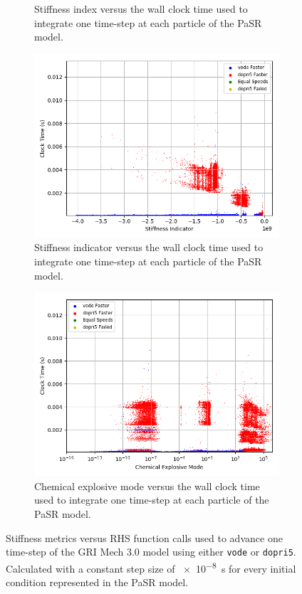 \documentclass[12pt]{ussci}
\begin{document}
\begin{figure}[htbp]
\begin{subfigure}{0.43\textwidth}
       \caption{Stiffness index versus the wall clock time used to integrate one time-step at each particle of the PaSR model.}
       \label{fig:SI1GRIPaSR}
   \end{subfigure}
   \begin{subfigure}{0.43\textwidth}
       \includegraphics[width=\linewidth]{GRI_Mech_3/PaSR_Int_Times_Indicator_Groupings_1e-08.png}
       \caption{Stiffness indicator versus the wall clock time used to integrate one time-step at each particle of the PaSR model.}
       \label{fig:SI2GRIPaSR}
   \end{subfigure}
    \hfill   
   \begin{subfigure}{0.43\textwidth}
       \includegraphics[width=\linewidth]{GRI_Mech_3/PaSR_Int_Times_CEMA_Groupings_1e-08.png}
       \caption{Chemical explosive mode versus the wall clock time used to integrate one time-step at each particle of the PaSR model.}
       \label{fig:CEMGRIPaSR}
   \end{subfigure}
   \caption{Stiffness metrics versus RHS function calls used to advance one time-step of the GRI Mech 3.0 model using either \texttt{vode} or \texttt{dopri5}.  Calculated with a constant step size of \SI{e-8}{\second} for every initial condition represented in the PaSR model.}
   \label{fig:GRIPaSRStiffness}
\end{figure}
\end{document}
